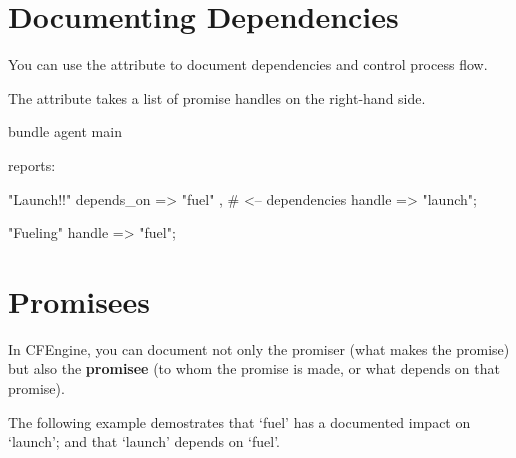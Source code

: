 \section{Documenting Dependencies}

You can use the  attribute to document dependencies
and control process flow.

The  attribute takes a list of promise handles on the right-hand side.

\begin{codelisting}
\begin{code}
bundle agent main
{
  reports:

      "Launch!!"
        depends_on => { "fuel" },  # <-- dependencies
        handle => "launch";

      "Fueling"
        handle => "fuel";
}
\end{code}
\end{codelisting}





\section{Promisees}

In CFEngine, you can document not only the promiser
(what makes the promise) but also the \textbf{promisee}
(to whom the promise is made, or what depends on
that promise).

The following example demostrates that `fuel'
has a documented impact on `launch'; and that
`launch' depends on `fuel'.

